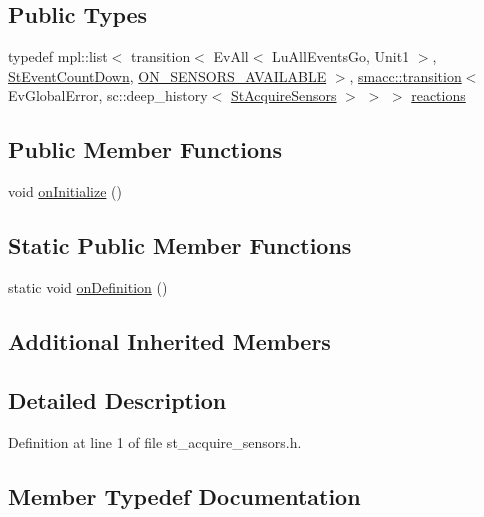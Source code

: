 \subsection*{Public Types}
\begin{DoxyCompactItemize}
\item 
typedef mpl\+::list$<$ transition$<$ Ev\+All$<$ Lu\+All\+Events\+Go, Unit1 $>$, \hyperlink{structStEventCountDown}{St\+Event\+Count\+Down}, \hyperlink{structStAcquireSensors_1_1ON__SENSORS__AVAILABLE}{O\+N\+\_\+\+S\+E\+N\+S\+O\+R\+S\+\_\+\+A\+V\+A\+I\+L\+A\+B\+LE} $>$, \hyperlink{classsmacc_1_1transition}{smacc\+::transition}$<$ Ev\+Global\+Error, sc\+::deep\+\_\+history$<$ \hyperlink{structStAcquireSensors}{St\+Acquire\+Sensors} $>$ $>$ $>$ \hyperlink{structStAcquireSensors_a3ea94ff0790c9954462b78aaebe36b30}{reactions}
\end{DoxyCompactItemize}
\subsection*{Public Member Functions}
\begin{DoxyCompactItemize}
\item 
void \hyperlink{structStAcquireSensors_af25bdea33dab12d2c37301eb999ac6e8}{on\+Initialize} ()
\end{DoxyCompactItemize}
\subsection*{Static Public Member Functions}
\begin{DoxyCompactItemize}
\item 
static void \hyperlink{structStAcquireSensors_a4f638e39d921300d4dcbc9ce5fa8d1c8}{on\+Definition} ()
\end{DoxyCompactItemize}
\subsection*{Additional Inherited Members}


\subsection{Detailed Description}


Definition at line 1 of file st\+\_\+acquire\+\_\+sensors.\+h.



\subsection{Member Typedef Documentation}
